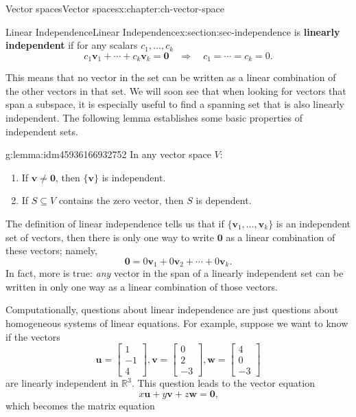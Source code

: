 \documentclass[oneside,10pt,]{book}
\newcommand{\terminology}[1]{\textbf{#1}}
\numberwithin{equation}{section}
\newcommand{\bbm}{\begin{bmatrix}}
\newcommand{\ebm}{\end{bmatrix}}
\newcommand{\uu}{\mathbf{u}}
\newcommand{\vv}{\mathbf{v}}
\newcommand{\ww}{\mathbf{w}}
\begin{document}
\begin{chapterptx}{Vector spaces}{}{Vector spaces}{}{}{x:chapter:ch-vector-space}
\begin{sectionptx}{Linear Independence}{}{Linear Independence}{}{}{x:section:sec-independence}
is \terminology{linearly independent} if for any scalars \(c_1,\ldots, c_k\)%
\begin{equation*}
c_1\vv_1+\cdots + c_k\vv_k = \mathbf{0} \quad\Rightarrow\quad c_1=\cdots = c_k=0\text{.}
\end{equation*}
%
\par
This means that no vector in the set can be written as a linear combination of the other vectors in that set. We will soon see that when looking for vectors that span a subspace, it is especially useful to find a spanning set that is also linearly independent. The following lemma establishes some basic properties of independent sets.%
\begin{lemma}{}{}{g:lemma:idm45936166932752}%
In any vector space \(V\):%
\begin{enumerate}
\item{}If \(\vv\neq\mathbf{0}\), then \(\{\vv\}\) is independent.%
\item{}If \(S\subseteq V\) contains the zero vector, then \(S\) is dependent.%
\end{enumerate}
%
\end{lemma}
The definition of linear independence tells us that if \(\{\vv_1,\ldots, \vv_k\}\) is an independent set of vectors, then there is only one way to write \(\mathbf{0}\) as a linear combination of these vectors; namely,%
\begin{equation*}
\mathbf{0} = 0\vv_1+0\vv_2+\cdots +0\vv_k\text{.}
\end{equation*}
In fact, more is true: \emph{any} vector in the span of a linearly independent set can be written in only one way as a linear combination of those vectors.%
\par
Computationally, questions about linear independence are just questions about homogeneous systems of linear equations. For example, suppose we want to know if the vectors%
\begin{equation*}
\uu=\bbm 1\\-1\\4\ebm, \vv=\bbm 0\\2\\-3\ebm, \ww=\bbm 4\\0\\-3\ebm
\end{equation*}
are linearly independent in \(\mathbb{R}^3\). This question leads to the vector equation%
\begin{equation*}
x\uu+y\vv+z\ww=\mathbf{0}\text{,}
\end{equation*}
which becomes the matrix equation%

\end{sectionptx}
\end{chapterptx}
\end{document}
